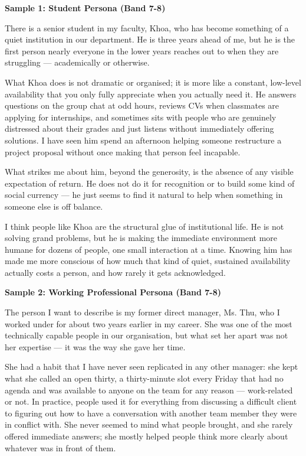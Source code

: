 \begin{ieltsanswer}
\textbf{Sample 1: Student Persona (Band 7-8)}

There is a senior student in my faculty, Khoa, who has become something of a quiet institution in our department. He is three years ahead of me, but he is the first person nearly everyone in the lower years reaches out to when they are struggling — academically or otherwise.

What Khoa does is not dramatic or organised; it is more like a constant, low-level availability that you only fully appreciate when you actually need it. He answers questions on the group chat at odd hours, reviews CVs when classmates are applying for internships, and sometimes sits with people who are genuinely distressed about their grades and just listens without immediately offering solutions. I have seen him spend an afternoon helping someone restructure a project proposal without once making that person feel incapable.

What strikes me about him, beyond the generosity, is the absence of any visible expectation of return. He does not do it for recognition or to build some kind of social currency — he just seems to find it natural to help when something in someone else is off balance.

I think people like Khoa are the structural glue of institutional life. He is not solving grand problems, but he is making the immediate environment more humane for dozens of people, one small interaction at a time. Knowing him has made me more conscious of how much that kind of quiet, sustained availability actually costs a person, and how rarely it gets acknowledged.

\textbf{Sample 2: Working Professional Persona (Band 7-8)}

The person I want to describe is my former direct manager, Ms. Thu, who I worked under for about two years earlier in my career. She was one of the most technically capable people in our organisation, but what set her apart was not her expertise — it was the way she gave her time.

She had a habit that I have never seen replicated in any other manager: she kept what she called an open thirty, a thirty-minute slot every Friday that had no agenda and was available to anyone on the team for any reason — work-related or not. In practice, people used it for everything from discussing a difficult client to figuring out how to have a conversation with another team member they were in conflict with. She never seemed to mind what people brought, and she rarely offered immediate answers; she mostly helped people think more clearly about whatever was in front of them.


\end{ieltsanswer}
